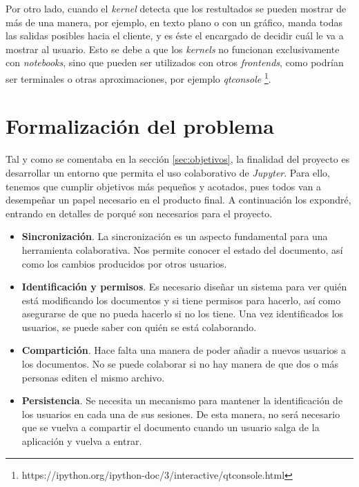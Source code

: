 \documentclass[11pt,spanish,listoffigures]{tfgetsinf}
\begin{document}
Por otro lado, cuando el \textit{kernel} detecta que los restultados se pueden mostrar de más de una manera, por ejemplo, en texto plano o con un gráfico, manda todas las salidas posibles hacia el cliente, y es éste el encargado de decidir cuál le va a mostrar al usuario. Esto se debe a que los \textit{kernels} no funcionan exclusivamente con \textit{notebooks}, sino que pueden ser utilizados con otros \textit{frontends}, como podrían ser terminales o otras aproximaciones, por ejemplo \textit{qtconsole} \footnote{https://ipython.org/ipython-doc/3/interactive/qtconsole.html}.



\section{Formalización del problema}
\label{sec:formalizacion}

Tal y como se comentaba en la sección \ref{sec:objetivos}, la finalidad del proyecto es desarrollar un entorno que permita el uso colaborativo de \textit{Jupyter}. Para ello, tenemos que cumplir objetivos más pequeños y acotados, pues todos van a desempeñar un papel necesario en el producto final. A continuación los expondré, entrando en detalles de porqué son necesarios para el proyecto.

\begin{itemize}

\item \textbf{Sincronización}. La sincronización es un aspecto fundamental para una herramienta colaborativa. Nos permite conocer el estado del documento, así como los cambios producidos por otros usuarios. 


\item \textbf{Identificación y permisos}. Es necesario diseñar un sistema para ver quién está modificando los documentos y si tiene permisos para hacerlo, así como asegurarse de que no pueda hacerlo si no los tiene. Una vez identificados los usuarios, se puede saber con quién se está colaborando.

\item \textbf{Compartición}. Hace falta una manera de poder añadir a nuevos usuarios a los documentos. No se puede  colaborar si no hay manera de que dos o más personas editen el mismo archivo.

\item \textbf{Persistencia}. Se necesita un mecanismo para mantener la identificación de los usuarios en cada una de sus sesiones. De esta manera, no será necesario que se vuelva a compartir el documento cuando un usuario salga de la aplicación y vuelva a entrar.

\end{itemize}
\end{document}
